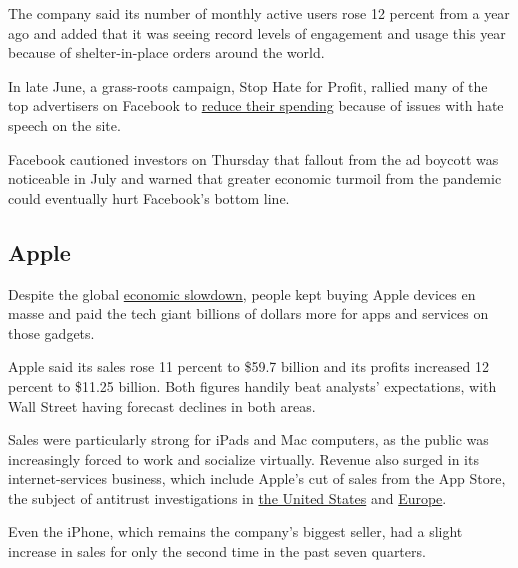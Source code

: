 The company said its number of monthly active users rose 12 percent from
a year ago and added that it was seeing record levels of engagement and
usage this year because of shelter-in-place orders around the world.

In late June, a grass-roots campaign, Stop Hate for Profit, rallied many
of the top advertisers on Facebook to
\href{https://slack-redir.net/link?url=https\%3A\%2F\%2Fwww.nytimes.com\%2F2020\%2F06\%2F30\%2Ftechnology\%2Ffacebook-advertising-boycott.html}{reduce
their spending} because of issues with hate speech on the site.

Facebook cautioned investors on Thursday that fallout from the ad
boycott was noticeable in July and warned that greater economic turmoil
from the pandemic could eventually hurt Facebook's bottom line.

\hypertarget{apple}{%
\subsection{Apple}\label{apple}}

Despite the global
\href{https://slack-redir.net/link?url=https\%3A\%2F\%2Fwww.nytimes.com\%2Flive\%2F2020\%2F07\%2F30\%2Fbusiness\%2Fstock-market-today-coronavirus\%2Fthe-us-economys-contraction-in-the-second-quarter-was-the-worst-on-record}{economic
slowdown}, people kept buying Apple devices en masse and paid the tech
giant billions of dollars more for apps and services on those gadgets.

Apple said its sales rose 11 percent to \$59.7 billion and its profits
increased 12 percent to \$11.25 billion. Both figures handily beat
analysts' expectations, with Wall Street having forecast declines in
both areas.

Sales were particularly strong for iPads and Mac computers, as the
public was increasingly forced to work and socialize virtually. Revenue
also surged in its internet-services business, which include Apple's cut
of sales from the App Store, the subject of antitrust investigations in
\href{https://slack-redir.net/link?url=https\%3A\%2F\%2Fwww.nytimes.com\%2F2020\%2F07\%2F28\%2Ftechnology\%2Famazon-apple-facebook-google-antitrust-hearing.html}{the
United States} and
\href{https://slack-redir.net/link?url=https\%3A\%2F\%2Fwww.nytimes.com\%2F2020\%2F06\%2F16\%2Fbusiness\%2Fapple-app-store-european-union-antitrust.html}{Europe}.

Even the iPhone, which remains the company's biggest seller, had a
slight increase in sales for only the second time in the past seven
quarters.

